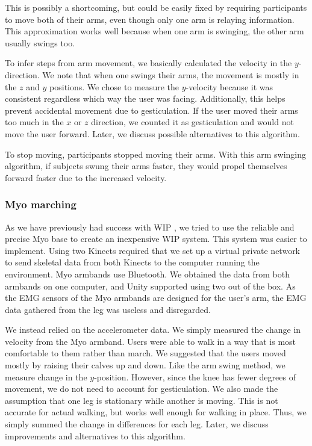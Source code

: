 \documentclass[titlepage]{article}
\theoremstyle{definition}
\theoremstyle{proof}
\begin{document}
This is possibly a shortcoming,
but could be easily fixed by requiring participants to move both of their arms,
even though only one arm is relaying information.
This approximation works well because when one arm is swinging, the other arm usually swings too.

To infer steps from arm movement,
we basically calculated the velocity in the $y$-direction.
We note that when one swings their arms,
the movement is mostly in the $z$ and $y$ positions.
We chose to measure the $y$-velocity because it was consistent regardless which way the user was facing.
Additionally, this helps prevent accidental movement due to gesticulation.
If the user moved their arms too much in the $x$ or $z$ direction,
we counted it as gesticulation and would not move the user forward.
Later, we discuss possible alternatives to this algorithm.

To stop moving, participants stopped moving their arms.
With this arm swinging algorithm, if subjects swung their arms faster,
they would propel themselves forward faster due to the increased velocity.

\subsubsection{Myo marching}
As we have previously had success with WIP \cite{Williams:2011:EWP},
we tried to use the reliable and precise Myo base to create an inexpensive WIP system.
This system was easier to implement.
Using two Kinects required that we set up a virtual private network to send skeletal data from both Kinects
to the computer running the environment.
Myo armbands use Bluetooth.
We obtained the data from both armbands on one computer,
and Unity supported using two out of the box.
As the EMG sensors of the Myo armbands are designed for the user's arm,
the EMG data gathered from the leg was useless and disregarded.

We instead relied on the accelerometer data.
We simply measured the change in velocity from the Myo armband.
Users were able to walk in a way that is most comfortable to them rather than march.
We suggested that the users moved mostly by raising their calves up and down.
Like the arm swing method, we measure change in the $y$-position.
However, since the knee has fewer degrees of movement,
we do not need to account for gesticulation.
We also made the assumption that one leg is stationary while another is moving.
This is not accurate for actual walking, but works well enough for walking in place.
Thus, we simply summed the change in differences for each leg.
Later, we discuss improvements and alternatives to this algorithm.
\end{document}
